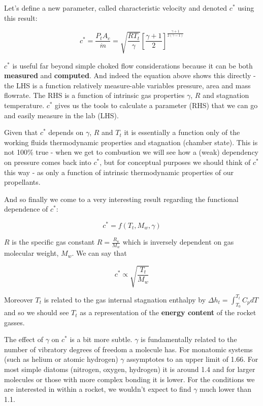 \documentclass[11pt]{article}
\begin{document}
Let's define a new parameter, called characteristic velocity and denoted
\(c^{*}\) using this result:

\[c^* = \frac{P_t A_c}{\dot{m}} = \sqrt{\frac{R T_t}{\gamma}}\left[\frac{\gamma + 1}{2}\right]^{\frac{\gamma + 1}{2(\gamma - 1)}}\]

\(c^*\) is useful far beyond simple choked flow considerations because
it can be both \textbf{measured} and \textbf{computed}. And indeed the
equation above shows this directly - the LHS is a function relatively
measure-able variables pressure, area and mass flowrate. The RHS is a
function of intrinsic gas properties \(\gamma\), \(R\) and stagnation
temperature. \(c^*\) gives us the tools to calculate a parameter (RHS)
that we can go and easily measure in the lab (LHS).

Given that \(c^*\) depends on \(\gamma\), \(R\) and \(T_t\) it is
essentially a function only of the working fluids thermodynamic
properties and stagnation (chamber state). This is not 100\% true - when
we get to combustion we will see how a (weak) dependency on pressure
comes back into \(c^*\), but for conceptual purposes we should think of
\(c^*\) this way - as only a function of intrinsic thermodynamic
properties of our propellants.

And so finally we come to a very interesting result regarding the
functional dependence of \(c^*\):

\[c^* = f(T_t, M_w, \gamma)\]

\(R\) is the specific gas constant \(R = \frac{R_u}{M_w}\) which is
inversely dependent on gas molecular weight, \(M_w\). We can say that

\[c^* \propto \sqrt{\frac{T_t}{M_w}}\]

Moreover \(T_t\) is related to the gas internal stagnation enthalpy by
\(\Delta h_t = \int_{T_0}^{T_t} C_p dT\) and so we should see \(T_t\) as
a representation of the \textbf{energy content} of the rocket gasses.

The effect of \(\gamma\) on \(c^*\) is a bit more subtle. \(\gamma\) is
fundamentally related to the number of vibratory degrees of freedom a
molecule has. For monatomic systems (such as helium or atomic hydrogen)
\(\gamma\) assymptotes to an upper limit of 1.66. For most simple
diatoms (nitrogen, oxygen, hydrogen) it is around 1.4 and for larger
molecules or those with more complex bonding it is lower. For the
conditions we are interested in within a rocket, we wouldn't expect to
find \(\gamma\) much lower than 1.1.
\end{document}
